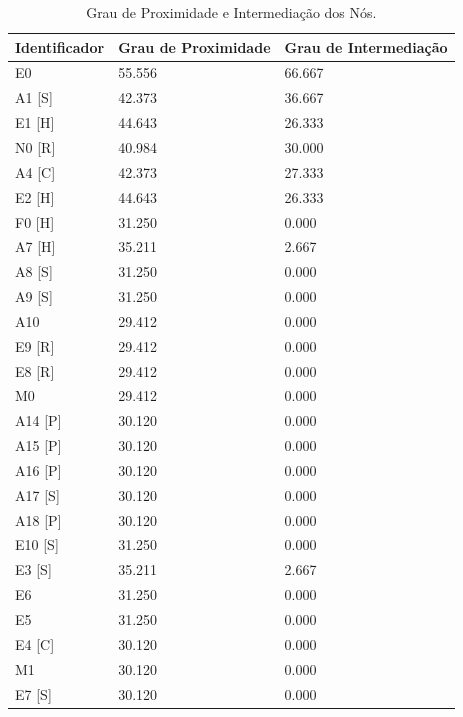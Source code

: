 \begin{table}[htbp]
\centering
\caption{Grau de Proximidade e Intermediação dos Nós.}
\label{closeness-betweeness-degree}
\begin{tabular}{|l|l|l|}
\hline
Identificador & Grau de Proximidade & Grau de Intermediação \\ \hline
E0            & 55.556              & 66.667                \\ \hline
A1 {[}S{]}    & 42.373              & 36.667                \\ \hline
E1 {[}H{]}    & 44.643              & 26.333                \\ \hline
N0 {[}R{]}    & 40.984              & 30.000                \\ \hline
A4 {[}C{]}    & 42.373              & 27.333                \\ \hline
E2 {[}H{]}    & 44.643              & 26.333                \\ \hline
F0 {[}H{]}    & 31.250              & 0.000                 \\ \hline
A7 {[}H{]}    & 35.211              & 2.667                 \\ \hline
A8 {[}S{]}    & 31.250              & 0.000                 \\ \hline
A9 {[}S{]}    & 31.250              & 0.000                 \\ \hline
A10           & 29.412              & 0.000                 \\ \hline
E9 {[}R{]}    & 29.412              & 0.000                 \\ \hline
E8 {[}R{]}    & 29.412              & 0.000                 \\ \hline
M0            & 29.412              & 0.000                 \\ \hline
A14 {[}P{]}   & 30.120              & 0.000                 \\ \hline
A15 {[}P{]}   & 30.120              & 0.000                 \\ \hline
A16 {[}P{]}   & 30.120              & 0.000                 \\ \hline
A17 {[}S{]}   & 30.120              & 0.000                 \\ \hline
A18 {[}P{]}   & 30.120              & 0.000                 \\ \hline
E10 {[}S{]}   & 31.250              & 0.000                 \\ \hline
E3 {[}S{]}    & 35.211              & 2.667                 \\ \hline
E6            & 31.250              & 0.000                 \\ \hline
E5            & 31.250              & 0.000                 \\ \hline
E4 {[}C{]}    & 30.120              & 0.000                 \\ \hline
M1            & 30.120              & 0.000                 \\ \hline
E7 {[}S{]}    & 30.120              & 0.000                 \\ \hline
\end{tabular}
\end{table}

